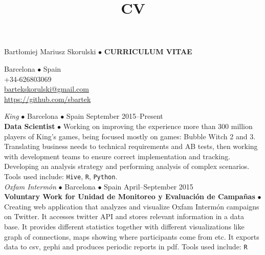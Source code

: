 \documentclass[a4paper, oneside]{scrreprt}
\title{CV}
\author{}
\date{}
\begin{document}
\vspace{1cm}
\noindent Bartłomiej Mariusz Skorulski $\bullet$ \textbf{CURRICULUM VITAE}

\vspace{-0.3cm}
\noindent\makebox[\linewidth]{\rule{\textwidth}{0.4pt}}

\vspace{0.6cm}
\noindent\llap{\FA \faHome\ \ } Barcelona $\bullet$ Spain\\
\noindent\llap{\FA \faMobilePhone\ \ \ } +34-626803069\\
\noindent\llap{\FA \faEnvelope\ \ } \href{mailto:bartekskorulski@gmail.com}{bartekskorulski@gmail.com}\\
\noindent\llap{\FA \faGithub\ \ } \href{https://github.com/sbartek}{https://github.com/sbartek}\\

\noindent\makebox[\linewidth]{\rule{\textwidth}{0.4pt}}

\vspace{0.6cm}


\noindent{}\textit{King} $\bullet$ 
Barcelona $\bullet$ Spain \hfill September 2015--Present\\
\noindent\textbf{\small Data Scientist } $\bullet$ 
{\small Working on improving the experience more than 300 million
  players of King's games, being focused mostly on games: Bubble Witch
  2 and 3.  Translating business needs to technical requirements and
  AB tests, then working with development teams to ensure correct
  implementation and tracking.
  Developing an analysis strategy and performing analysis of complex scenarios.
  Tools used include: \texttt{Hive}, \texttt{R}, \texttt{Python}. }\\

\noindent{}\textit{Oxfam Intermón} $\bullet$ 
Barcelona $\bullet$ Spain \hfill April--September 2015\\
\noindent\textbf{\small Voluntary Work for Unidad de Monitoreo y Evaluación de Campañas} $\bullet$ 
{\small Creating web application that analyzes and visualize Oxfam Intermón
  campaigns on Twitter. It accesses twitter API and stores relevant
  information in a data base. It provides different
  statistics together with different
  visualizations like graph of connections, maps showing
  where participants come from etc. It exports data to csv, gephi and
  produces periodic reports in pdf.  Tools used
  include: \texttt{R}}\\
\end{document}
